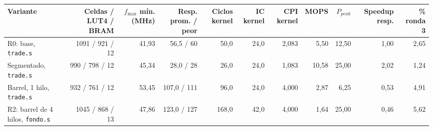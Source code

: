 \begin{tabular}{lrrrrrrrrrr}
\toprule
Variante & Celdas / LUT4 / BRAM & $f_{\max}$ mín. (MHz) & Resp. prom. / peor & Ciclos kernel & IC kernel & CPI kernel & MOPS & $P_{peak}$ & Speedup resp. & \% ronda 3 \\
\midrule
R0: base, \texttt{trade.s} & 1091 / 921 / 12 & 41{,}93 & 56{,}5 / 60 & 50{,}0 & 24{,}0 & 2{,}083 & 5{,}50 & 12{,}50 & 1{,}00 & 2{,}65 \\
Segmentado, \texttt{trade.s} & 990 / 798 / 12 & 45{,}34 & 28{,}0 / 28 & 26{,}0 & 24{,}0 & 1{,}083 & 10{,}58 & 25{,}00 & 2{,}02 & 1{,}24 \\
Barrel, 1 hilo, \texttt{trade.s} & 932 / 761 / 12 & 53{,}45 & 107{,}0 / 111 & 96{,}0 & 24{,}0 & 4{,}000 & 2{,}87 & 6{,}25 & 0{,}53 & 4{,}91 \\
R2: barrel de 4 hilos, \texttt{fondo.s} & 1045 / 868 / 13 & 47{,}86 & 123{,}0 / 127 & 168{,}0 & 42{,}0 & 4{,}000 & 1{,}64 & 25{,}00 & 0{,}46 & 5{,}62 \\
\bottomrule
\end{tabular}
\par{}
